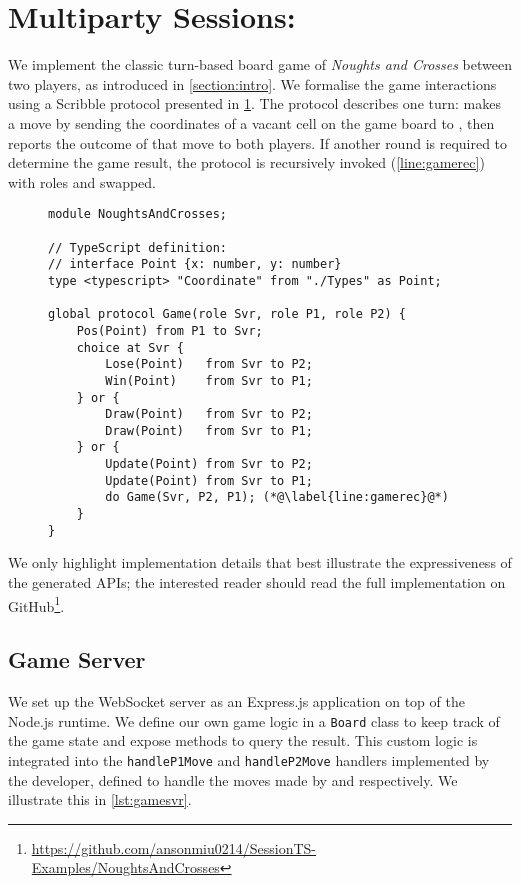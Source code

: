 \section{Multiparty Sessions: }
\label{section:evalgame}

We implement the classic turn-based board game of \textit{Noughts and Crosses}
between two players,
as introduced in \cref{section:intro}.
We formalise the game interactions using a Scribble protocol
presented in \cref{lst:game}.
The  protocol describes one turn:
 makes a move by sending the coordinates of a
vacant cell on the game board to ,
then  reports the outcome of that move
to both players. If another round is required
to determine the game result, the 
protocol is recursively invoked (\cref{line:gamerec}) with
roles  and  swapped.

\begin{figure}[!ht]
\begin{lstlisting}[language=Scribble]
module NoughtsAndCrosses;

// TypeScript definition:
// interface Point {x: number, y: number}
type <typescript> "Coordinate" from "./Types" as Point;

global protocol Game(role Svr, role P1, role P2) {
	Pos(Point) from P1 to Svr;
	choice at Svr {
		Lose(Point)   from Svr to P2;
		Win(Point)    from Svr to P1;
	} or {
		Draw(Point)   from Svr to P2;
		Draw(Point)   from Svr to P1;
	} or {
		Update(Point) from Svr to P2;
		Update(Point) from Svr to P1;
		do Game(Svr, P2, P1); (*@\label{line:gamerec}@*)
	}
}
\end{lstlisting}
\label{lst:game}
\end{figure}

We only highlight implementation details that
best illustrate the expressiveness of the generated APIs;
the interested reader should read the full implementation on
GitHub\footnote{
\url{https://github.com/ansonmiu0214/SessionTS-Examples/NoughtsAndCrosses}
}.

\subsection{Game Server}
We set up the WebSocket server as an Express.js \cite{Express} application
on top of the Node.js runtime.
We define our own game logic in a \texttt{Board} class
to keep track of the game state and expose methods 
to query the result.
This custom logic is integrated into the 
\texttt{handleP1Move} and \texttt{handleP2Move}
handlers implemented by the developer, defined to
handle the moves made by  and  respectively.
We illustrate this in \cref{lst:gamesvr}.

